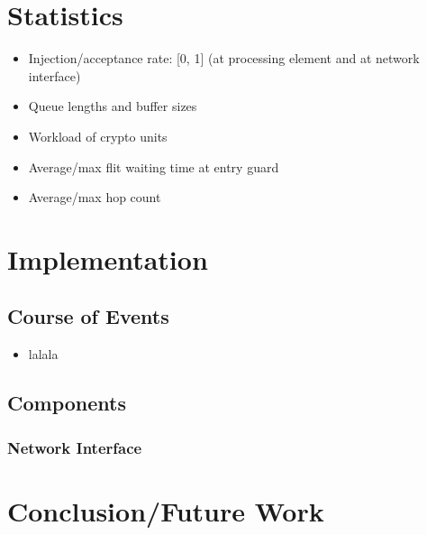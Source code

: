\documentclass[
	paper=a4,
	fontsize=11pt,
	parskip=full %
]{scrreprt}
\begin{document}
    \chapter{Statistics}
    \begin{itemize}
        \item Injection/acceptance rate: [0, 1] (at processing element and at network interface)
        \item Queue lengths and buffer sizes
        \item Workload of crypto units
        \item Average/max flit waiting time at entry guard
        \item Average/max hop count
    \end{itemize}

    \chapter{Implementation}
    \section{Course of Events}
    \begin{itemize}
        \item lalala
    \end{itemize}

    \section{Components}
    \subsection{Network Interface}

    \chapter{Conclusion/Future Work}
    
\end{document}
